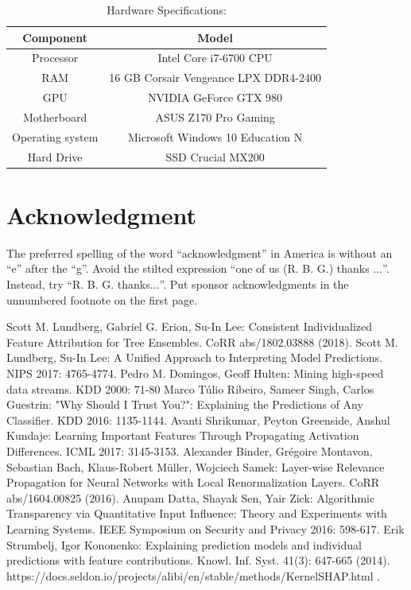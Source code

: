\documentclass[conference]{IEEEtran}
\begin{document}
\begin{table}[htbp]
\caption{Hardware Specifications:}
\begin{center}
\begin{tabular}{|c|c|}
	\hline
	\textbf{Component} & \textbf{Model} \\
	\hline
	Processor & Intel Core i7-6700 CPU\\ \hline
	RAM & 16 GB Corsair Vengeance LPX DDR4-2400\\ \hline
	GPU & NVIDIA GeForce GTX 980 \\ \hline
	Motherboard & ASUS Z170 Pro Gaming \\ \hline
	Operating system & Microsoft Windows 10 Education N \\ \hline
	Hard Drive & SSD Crucial MX200 \\ \hline
\end{tabular}
\label{hardware}
\end{center}
\end{table}





\section*{Acknowledgment}

The preferred spelling of the word ``acknowledgment'' in America is without 
an ``e'' after the ``g''. Avoid the stilted expression ``one of us (R. B. 
G.) thanks $\ldots$''. Instead, try ``R. B. G. thanks$\ldots$''. Put sponsor 
acknowledgments in the unnumbered footnote on the first page.

\begin{thebibliography}{00}
 Scott M. Lundberg, Gabriel G. Erion, Su-In Lee:
Consistent Individualized Feature Attribution for Tree Ensembles. CoRR abs/1802.03888 (2018).
 Scott M. Lundberg, Su-In Lee: A Unified Approach to Interpreting Model Predictions. NIPS 2017: 4765-4774.
 Pedro M. Domingos, Geoff Hulten: Mining high-speed data streams. KDD 2000: 71-80
 Marco Túlio Ribeiro, Sameer Singh, Carlos Guestrin: "Why Should I Trust You?": Explaining the Predictions of Any Classifier. KDD 2016: 1135-1144.
 Avanti Shrikumar, Peyton Greenside, Anshul Kundaje: Learning Important Features Through Propagating Activation Differences. ICML 2017: 3145-3153.
 Alexander Binder, Grégoire Montavon, Sebastian Bach, Klaus-Robert Müller, Wojciech Samek: Layer-wise Relevance Propagation for Neural Networks with Local Renormalization Layers. CoRR abs/1604.00825 (2016).
Anupam Datta, Shayak Sen, Yair Zick: Algorithmic Transparency via Quantitative Input Influence: Theory and Experiments with Learning Systems. IEEE Symposium on Security and Privacy 2016: 598-617.
Erik Strumbelj, Igor Kononenko: Explaining prediction models and individual predictions with feature contributions. Knowl. Inf. Syst. 41(3): 647-665 (2014).
 https://docs.seldon.io/projects/alibi/en/stable/methods/KernelSHAP.html .

\end{thebibliography}
\end{document}
